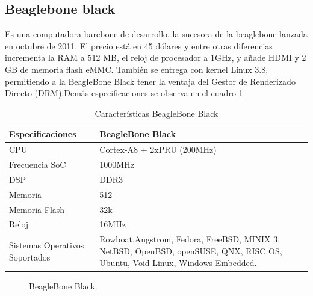 \documentclass[conference]{IEEEtran}
\begin{document}
	\subsection{Beaglebone black}
	Es una computadora barebone de desarrollo, la sucesora de la beaglebone lanzada en octubre de 2011. El precio está en 45 dólares y entre otras diferencias incrementa la RAM a 512 MB, el reloj de procesador a 1GHz, y añade HDMI y 2 GB de memoria flash eMMC. También se entrega con kernel Linux 3.8, permitiendo a la BeagleBone Black tener la ventaja del Gestor de Renderizado Directo (DRM).Demás especificaciones se observa en el cuadro \ref{tab:bb01}
		\begin{table}[h]
\begin{center}
	\begin{tabular}{|p{2.5cm}|p{5.5cm}|}
	\hline
	\textbf{Especificaciones} &\textbf{BeagleBone Black} \\ \hline
	CPU  &Cortex-A8 + 2xPRU (200MHz) \\\hline
	Frecuencia SoC &1000MHz \\\hline
	DSP &DDR3 \\\hline
	Memoria & 512 \\\hline
	Memoria Flash &32k\\\hline
	Reloj &16MHz \\\hline
	Sistemas Operativos Soportados &Rowboat,Angstrom, Fedora, FreeBSD, MINIX 3, NetBSD, OpenBSD, openSUSE, QNX, RISC OS, Ubuntu, Void Linux, Windows Embedded.\\\hline
\end{tabular}\vspace{0.25cm}
\caption{Características BeagleBone Black}
\label{tab:bb01}
\end{center}
\end{table}
\begin{figure}[h]
	\caption{BeagleBone Black.}
	\label{fig:ant01}
\end{figure}
\end{document}

